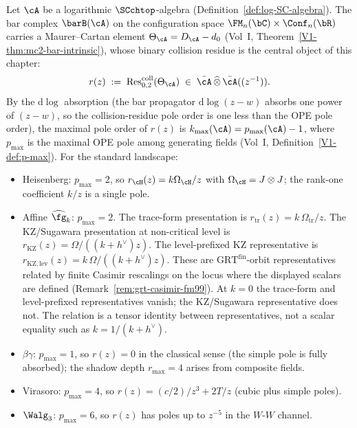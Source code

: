 Let $\cA$ be a logarithmic $\SCchtop$-algebra
\textup{(}Definition~\textup{\ref{def:log-SC-algebra}}\textup{)}. The bar complex
$\barB(\cA)$ on the configuration space $\FM_n(\bC)\times\Conf_n(\bR)$
carries a Maurer--Cartan element $\Theta_\cA = D_\cA - d_0$
\textup{(}Vol~I, Theorem~\textup{\ref{V1-thm:mc2-bar-intrinsic}}\textup{)}, whose
binary collision residue is the central object of this chapter:
\begin{equation}\label{eq:dnp-master-collision-residue}
r(z)
\;:=\;
\operatorname{Res}^{\mathrm{coll}}_{0,2}(\Theta_\cA)
\;\in\;
\bar{\cA}\,\widehat{\otimes}\,\bar{\cA}((z^{-1})).
\end{equation}
By the $\mathrm d\log$ absorption (the bar propagator
$\mathrm d\log(z-w)$ absorbs one power of $(z-w)$, so the
collision-residue pole order is one less than the OPE pole order),
the maximal pole order of $r(z)$ is $k_{\max}(\cA) = p_{\max}(\cA) - 1$, where
$p_{\max}$ is the maximal OPE pole among generating fields
\textup{(}Vol~I, Definition~\textup{\ref{V1-def:p-max}}\textup{)}. For the standard
landscape:
\begin{itemize}
\item Heisenberg: $p_{\max}=2$, so
$r_{\cH}(z)=k\Omega_{\cH}/z$ with $\Omega_{\cH}=J\otimes J$; the
rank-one coefficient $k/z$ is a single pole.
\item Affine $\widehat{\fg}_k$: $p_{\max}=2$.  The trace-form
 presentation is $r_{\mathrm{tr}}(z)=k\,\Omega_{\mathrm{tr}}/z$.  The KZ/Sugawara
 presentation at non-critical level is
 $r_{\mathrm{KZ}}(z)=\Omega/((k+h^\vee)z)$.  The level-prefixed KZ
 representative is $r_{\mathrm{KZ,lev}}(z)=k\,\Omega/((k+h^\vee)z)$.
 These are $\mathrm{GRT}^{\mathrm{fin}}$-orbit representatives related
 by finite Casimir rescalings on the locus where the displayed scalars
 are defined (Remark~\ref{rem:grt-casimir-fm99}).  At $k=0$ the
 trace-form and level-prefixed representatives vanish; the
 KZ/Sugawara representative does not.  The relation is a tensor
 identity between representatives, not a scalar equality such as
 $k=1/(k+h^\vee)$.
\item $\beta\gamma$: $p_{\max}=1$, so $r(z) = 0$ in the classical sense
 (the simple pole is fully absorbed); the shadow depth $r_{\max}=4$
 arises from composite fields.
\item Virasoro: $p_{\max}=4$, so
 $r(z) = (c/2)/z^3 + 2T/z$ (cubic plus simple poles).
\item $\Walg_3$: $p_{\max}=6$, so $r(z)$ has poles up to $z^{-5}$ in the
 $W$-$W$ channel.
\end{itemize}

